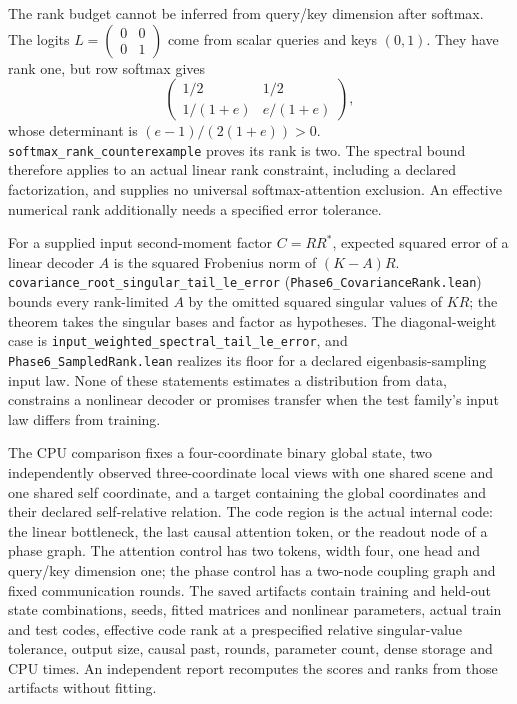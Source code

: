 \documentclass{article}
\begin{document}
The rank budget cannot be inferred from query/key dimension after softmax.
The logits $L=\left(\begin{smallmatrix}0&0\\0&1\end{smallmatrix}\right)$
come from scalar queries and keys $(0,1)$. They have rank one, but row softmax
gives
\[
 \begin{pmatrix}1/2&1/2\\1/(1+e)&e/(1+e)\end{pmatrix},
\]
whose determinant is $(e-1)/(2(1+e))>0$.
\nolinkurl{softmax_rank_counterexample} proves its
rank is two. The spectral bound therefore applies to an actual linear rank
constraint, including a declared factorization, and supplies no universal
softmax-attention exclusion. An effective numerical rank additionally needs
a specified error tolerance.

For a supplied input second-moment factor $C=RR^*$, expected squared error
of a linear decoder $A$ is the squared Frobenius norm of $(K-A)R$.
\nolinkurl{covariance_root_singular_tail_le_error}
(\nolinkurl{Phase6_CovarianceRank.lean}) bounds every rank-limited $A$ by
the omitted squared singular values of $KR$; the theorem takes the singular
bases and factor as hypotheses. The diagonal-weight case is
\nolinkurl{input_weighted_spectral_tail_le_error}, and
\nolinkurl{Phase6_SampledRank.lean} realizes its floor for a declared
eigenbasis-sampling input law. None of these statements estimates a
distribution from data, constrains a nonlinear decoder or promises transfer
when the test family's input law differs from training.

The CPU comparison fixes a four-coordinate binary global state, two
independently observed three-coordinate local views with one shared scene and
one shared self coordinate, and a target containing the global coordinates
and their declared self-relative relation. The code region is the actual
internal code: the linear bottleneck, the last causal attention token, or the
readout node of a phase graph. The attention control has two tokens, width
four, one head and query/key dimension one; the phase control has a two-node
coupling graph and fixed communication rounds. The saved artifacts contain
training and held-out state combinations, seeds, fitted matrices and
nonlinear parameters, actual train and test codes, effective code rank at a
prespecified relative singular-value tolerance, output size, causal past,
rounds, parameter count, dense storage and CPU times. An independent report
recomputes the scores and ranks from those artifacts without fitting.
\end{document}
